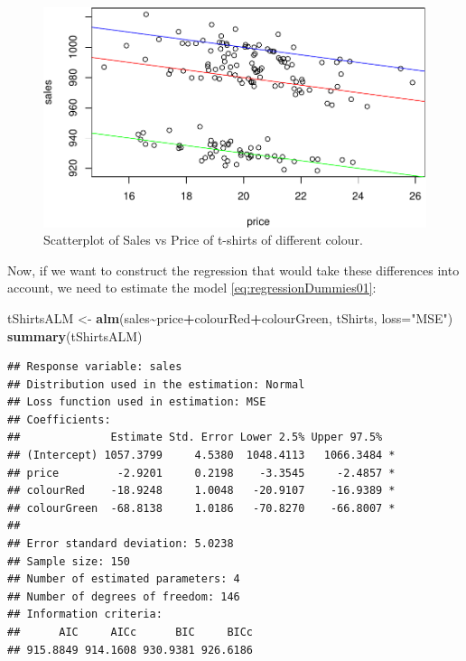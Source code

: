 \documentclass[
]{book}
\newenvironment{Shaded}{\begin{snugshade}}{\end{snugshade}}
\newcommand{\AttributeTok}[1]{\textcolor[rgb]{0.13,0.29,0.53}{#1}}
\newcommand{\FunctionTok}[1]{\textcolor[rgb]{0.13,0.29,0.53}{\textbf{#1}}}
\newcommand{\NormalTok}[1]{#1}
\newcommand{\OtherTok}[1]{\textcolor[rgb]{0.56,0.35,0.01}{#1}}
\newcommand{\SpecialCharTok}[1]{\textcolor[rgb]{0.81,0.36,0.00}{\textbf{#1}}}
\newcommand{\StringTok}[1]{\textcolor[rgb]{0.31,0.60,0.02}{#1}}
\theoremstyle{definition}
\theoremstyle{definition}
\theoremstyle{definition}
\theoremstyle{definition}
\theoremstyle{remark}
\begin{document}
\begin{figure}
\centering
\includegraphics{Svetunkov---Statistics-for-Business-Analytics_files/figure-latex/tShirtsScatterPlot-1.pdf}
\caption{\label{fig:tShirtsScatterPlot}Scatterplot of Sales vs Price of t-shirts of different colour.}
\end{figure}

Now, if we want to construct the regression that would take these differences into account, we need to estimate the model \eqref{eq:regressionDummies01}:

\begin{Shaded}
\begin{Highlighting}[]
\NormalTok{tShirtsALM }\OtherTok{\textless{}{-}} \FunctionTok{alm}\NormalTok{(sales}\SpecialCharTok{\textasciitilde{}}\NormalTok{price}\SpecialCharTok{+}\NormalTok{colourRed}\SpecialCharTok{+}\NormalTok{colourGreen, tShirts, }\AttributeTok{loss=}\StringTok{"MSE"}\NormalTok{)}
\FunctionTok{summary}\NormalTok{(tShirtsALM)}
\end{Highlighting}
\end{Shaded}

\begin{verbatim}
## Response variable: sales
## Distribution used in the estimation: Normal
## Loss function used in estimation: MSE
## Coefficients:
##              Estimate Std. Error Lower 2.5% Upper 97.5%  
## (Intercept) 1057.3799     4.5380  1048.4113   1066.3484 *
## price         -2.9201     0.2198    -3.3545     -2.4857 *
## colourRed    -18.9248     1.0048   -20.9107    -16.9389 *
## colourGreen  -68.8138     1.0186   -70.8270    -66.8007 *
## 
## Error standard deviation: 5.0238
## Sample size: 150
## Number of estimated parameters: 4
## Number of degrees of freedom: 146
## Information criteria:
##      AIC     AICc      BIC     BICc 
## 915.8849 914.1608 930.9381 926.6186
\end{verbatim}
\end{document}
